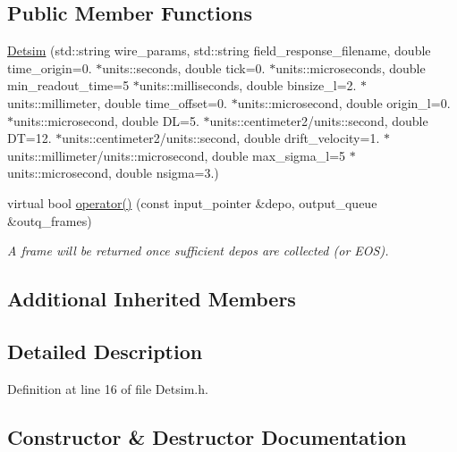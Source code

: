 \subsection*{Public Member Functions}
\begin{DoxyCompactItemize}
\item 
\hyperlink{class_wire_cell_1_1_detsim_aaf2db8b6e371a75a2541e9378b14c989}{Detsim} (std\+::string wire\+\_\+params, std\+::string field\+\_\+response\+\_\+filename, double time\+\_\+origin=0. $\ast$units\+::seconds, double tick=0. $\ast$units\+::microseconds, double min\+\_\+readout\+\_\+time=5 $\ast$units\+::milliseconds, double binsize\+\_\+l=2. $\ast$units\+::millimeter, double time\+\_\+offset=0. $\ast$units\+::microsecond, double origin\+\_\+l=0. $\ast$units\+::microsecond, double DL=5. $\ast$units\+::centimeter2/units\+::second, double DT=12. $\ast$units\+::centimeter2/units\+::second, double drift\+\_\+velocity=1. $\ast$units\+::millimeter/units\+::microsecond, double max\+\_\+sigma\+\_\+l=5 $\ast$units\+::microsecond, double nsigma=3.)
\item 
virtual bool \hyperlink{class_wire_cell_1_1_detsim_a95dee7e3679dbd59ea5de486d0c31d28}{operator()} (const input\+\_\+pointer \&depo, output\+\_\+queue \&outq\+\_\+frames)
\begin{DoxyCompactList}\small\item\em A frame will be returned once sufficient depos are collected (or E\+OS). \end{DoxyCompactList}\end{DoxyCompactItemize}
\subsection*{Additional Inherited Members}


\subsection{Detailed Description}


Definition at line 16 of file Detsim.\+h.



\subsection{Constructor \& Destructor Documentation}
\mbox{\label{class_wire_cell_1_1_detsim_aaf2db8b6e371a75a2541e9378b14c989}} 
